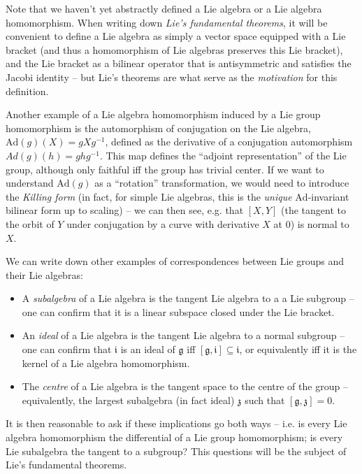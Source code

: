 \documentclass{article}
\newcommand{\Ad}{\mathrm{Ad}}
\begin{document}
Note that we haven't yet abstractly defined a Lie algebra or a Lie algebra homomorphism. When writing down \emph{Lie's fundamental theorems}, it will be convenient to define a Lie algebra as simply a vector space equipped with a Lie bracket (and thus a homomorphism of Lie algebras preserves this Lie bracket), and the Lie bracket as a bilinear operator that is antisymmetric and satisfies the Jacobi identity -- but Lie's theorems are what serve as the \emph{motivation} for this definition.

Another example of a Lie algebra homomorphism induced by a Lie group homomorphism is the automorphism of conjugation on the Lie algebra, $\Ad(g)(X)=gXg^{-1}$, defined as the derivative of a conjugation automorphism $Ad(g)(h)=ghg^{-1}$. This map defines the ``adjoint representation'' of the Lie group, although only faithful iff the group has trivial center. If we want to understand $\Ad(g)$ as a ``rotation'' transformation, we would need to introduce the \emph{Killing form} (in fact, for simple Lie algebras, this is the \emph{unique} $\Ad$-invariant bilinear form up to scaling) -- we can then see, e.g. that $[X,Y]$ (the tangent to the orbit of $Y$ under conjugation by a curve with derivative $X$ at 0) is normal to $X$.

We can write down other examples of correspondences between Lie groups and their Lie algebras:

\begin{itemize}
    \item A \emph{subalgebra} of a Lie algebra is the tangent Lie algebra to a a Lie subgroup -- one can confirm that it is a linear subspace closed under the Lie bracket.
    \item An \emph{ideal} of a Lie algebra is the tangent Lie algebra to a normal subgroup -- one can confirm that $\mathfrak{i}$ is an ideal of $\mathfrak{g}$ iff $[\mathfrak{g},\mathfrak{i}]\subseteq\mathfrak{i}$, or equivalently iff it is the kernel of a Lie algebra homomorphism.
    \item The \emph{centre} of a Lie algebra is the tangent space to the centre of the group -- equivalently, the largest subalgebra (in fact ideal) $\mathfrak{z}$ such that $[\mathfrak{g},\mathfrak{z}]=0$.
\end{itemize}

It is then reasonable to ask if these implications go both ways -- i.e. is every Lie algebra homomorphism the differential of a Lie group homomorphism; is every Lie subalgebra the tangent to a subgroup? This questions will be the subject of Lie's fundamental theorems.
\end{document}
